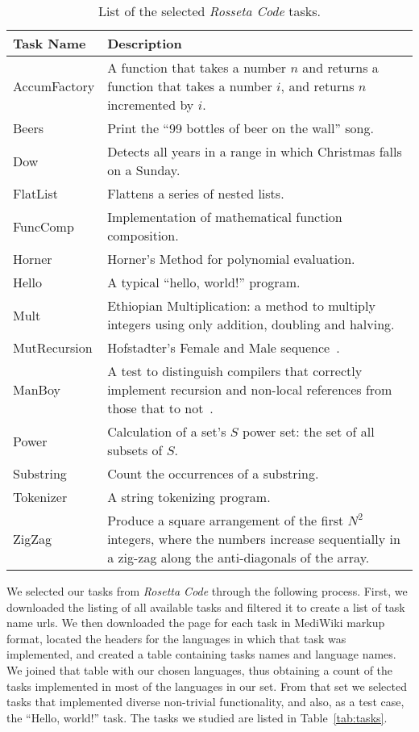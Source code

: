 \documentclass[10pt]{sigplanconf}
\begin{document}
\begin{table}
\begin{center}
\begin{tabular}{ l p{5cm}}
 \hline
Task Name & Description\\
\hline
AccumFactory & A function that takes a number $n$ and returns a function that takes a number $i$,
and returns $n$ incremented by $i$. \\
Beers & Print the ``99 bottles of beer on the wall'' song.\\
Dow & Detects all years in a range in which Christmas falls on a Sunday.\\
FlatList & Flattens a series of nested lists.\\
FuncComp & Implementation of mathematical function composition.\\
Horner & Horner's Method for polynomial evaluation.\\
Hello & A typical ``hello, world!'' program.\\
Mult & Ethiopian Multiplication: a method to multiply integers using only addition, doubling and halving.\\
MutRecursion & Hofstadter's Female and Male sequence~\cite{Hof89}.\\
ManBoy & A test to distinguish compilers that correctly implement
recursion and non-local references from those that to not~\cite{Knu64}.  \\
Power & Calculation of a set's $S$ power set: the set of all subsets of $S$.\\
Substring & Count the occurrences of a substring.\\
Tokenizer & A string tokenizing program.\\
ZigZag & Produce a square arrangement of the first $N^2$ integers,
where the numbers increase sequentially in a zig-zag along the anti-diagonals of the array.\\
\hline
\end{tabular}
\end{center}
\caption{List of the selected {\em Rosseta Code} tasks.}
\label{tab:Tasks}
\end{table}

We selected our tasks from {\em Rosetta Code} through the following process.
First, we downloaded the listing of all available tasks and
filtered it to create a list of task name {\sc url}s.
We then downloaded the page for each task in MediWiki markup format,
located the headers for the languages in which that task was implemented, and
created a table containing tasks names and language names.
We joined that table with our chosen languages,
thus obtaining a count of the tasks implemented in
most of the languages in our set.
From that set we selected tasks that implemented diverse
non-trivial functionality,
and also, as a test case, the ``Hello, world!'' task.
The tasks we studied are listed in Table~\ref{tab:tasks}.
\end{document}
